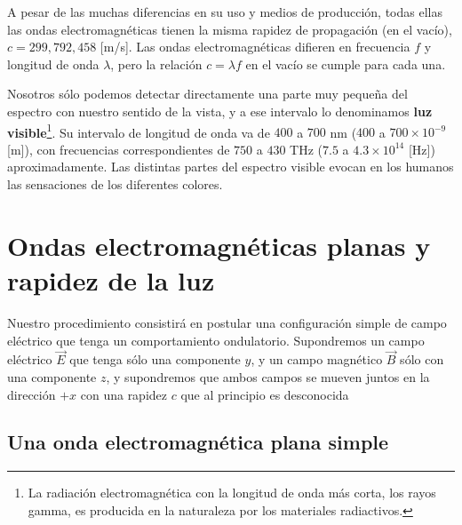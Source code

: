 A pesar de las muchas diferencias en su uso y medios de producción, todas ellas las ondas electromagnéticas tienen la misma rapidez de propagación (en el vacío), $c=299,792,458$ [m/s]. Las ondas electromagnéticas difieren en frecuencia $f$ y longitud de onda $\lambda$, pero la relación $c=\lambda f$ en el vacío se cumple para cada una.

Nosotros sólo podemos detectar directamente una parte muy pequeña del espectro con nuestro sentido de la vista, y a ese intervalo lo denominamos \textbf{luz visible}\footnote{La radiación electromagnética con la longitud de onda más corta, los rayos gamma, es producida en la naturaleza por los materiales radiactivos.}. Su intervalo de longitud de onda va de $400$ a $700$ nm ($400$ a $700\times 10^{-9}$ [m]), con frecuencias correspondientes de $750$ a $430$ THz ($7.5$ a $4.3\times 10^{14}$ [Hz]) aproximadamente.  Las distintas partes del espectro visible evocan en los humanos las sensaciones de los diferentes colores.


\section{Ondas electromagnéticas planas y rapidez de la luz}
Nuestro procedimiento consistirá en postular una configuración simple de campo eléctrico que tenga un comportamiento ondulatorio. Supondremos un campo eléctrico $\vec{E}$ que tenga sólo una componente $y$, y un campo magnético $\vec{B}$ sólo con una componente $z$, y supondremos que ambos campos se mueven juntos en la dirección $+x$ con una rapidez $c$ que al principio es desconocida

\subsection{Una onda electromagnética plana simple}

